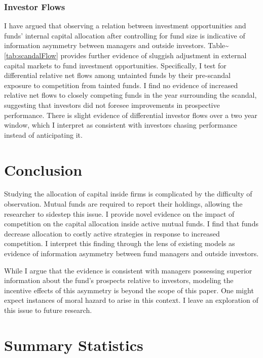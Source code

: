 \documentclass[openany]{book}
\theoremstyle{definition}
\theoremstyle{definition}
\theoremstyle{definition}
\theoremstyle{remark}
\begin{document}
\subsection{Investor Flows}

I have argued that observing a relation between investment opportunities
and funds' internal capital allocation after controlling for fund size
is indicative of information asymmetry between managers and outside
investors. Table\textasciitilde{}\ref{tab:scandalFlow} provides further
evidence of sluggish adjustment in external capital markets to fund
investment opportunities. Specifically, I test for differential relative
net flows among untainted funds by their pre-scandal exposure to
competition from tainted funds. I find no evidence of increased relative
net flows to closely competing funds in the year surrounding the
scandal, suggesting that investors did not foresee improvements in
prospective performance. There is slight evidence of differential
investor flows over a two year window, which I interpret as consistent
with investors chasing performance instead of anticipating it.

\chapter{Conclusion}\label{sec:conclusion}

Studying the allocation of capital inside firms is complicated by the
difficulty of observation. Mutual funds are required to report their
holdings, allowing the researcher to sidestep this issue. I provide
novel evidence on the impact of competition on the capital allocation
inside active mutual funds. I find that funds decrease allocation to
costly active strategies in response to increased competition. I
interpret this finding through the lens of existing models as evidence
of information asymmetry between fund managers and outside investors.

While I argue that the evidence is consistent with managers possessing
superior information about the fund's prospects relative to investors,
modeling the incentive effects of this asymmetry is beyond the scope of
this paper. One might expect instances of moral hazard to arise in this
context. I leave an exploration of this issue to future research.

\hypertarget{refs}{}

\appendix


\singlespacing

\chapter{Summary Statistics}\label{summary-statistics}
\end{document}
